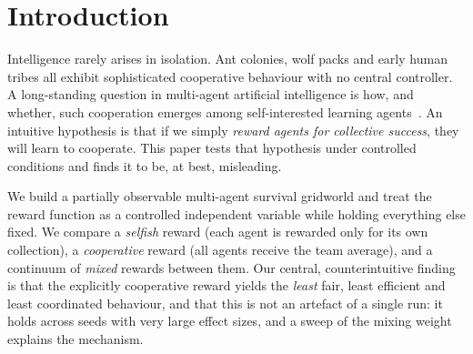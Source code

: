 \documentclass[sigconf,nonacm,anonymous,review]{acmart}
\begin{document}
\maketitle

\section{Introduction}
Intelligence rarely arises in isolation. Ant colonies, wolf packs and early human tribes all
exhibit sophisticated cooperative behaviour with no central controller. A long-standing
question in multi-agent artificial intelligence is how, and whether, such cooperation emerges
among self-interested learning agents~\cite{axelrod1984cooperation,leibo2017ssd}. An
intuitive hypothesis is that if we simply \emph{reward agents for collective success}, they
will learn to cooperate. This paper tests that hypothesis under controlled conditions and
finds it to be, at best, misleading.

We build a partially observable multi-agent survival gridworld and treat the reward function
as a controlled independent variable while holding everything else fixed. We compare a
\emph{selfish} reward (each agent is rewarded only for its own collection), a
\emph{cooperative} reward (all agents receive the team average), and a continuum of
\emph{mixed} rewards between them. Our central, counterintuitive finding is that the
explicitly cooperative reward yields the \emph{least} fair, least efficient and least
coordinated behaviour, and that this is not an artefact of a single run: it holds across
seeds with very large effect sizes, and a sweep of the mixing weight explains the mechanism.
\end{document}
